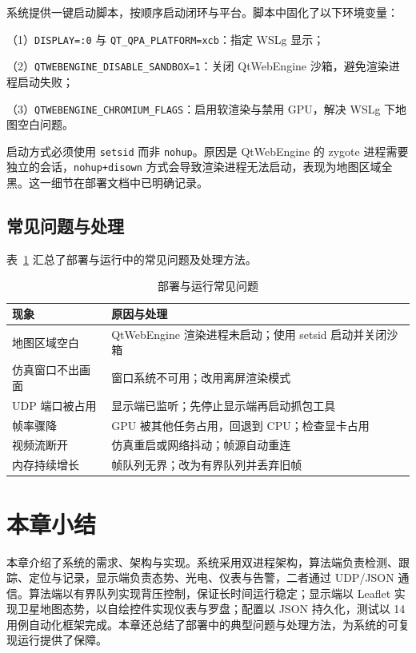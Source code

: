 系统提供一键启动脚本，按顺序启动闭环与平台。脚本中固化了以下环境变量：

（1）\texttt{DISPLAY=:0} 与 \texttt{QT\_QPA\_PLATFORM=xcb}：指定 WSLg 显示；

（2）\texttt{QTWEBENGINE\_DISABLE\_SANDBOX=1}：关闭 QtWebEngine 沙箱，避免渲染进程启动失败；

（3）\texttt{QTWEBENGINE\_CHROMIUM\_FLAGS}：启用软渲染与禁用 GPU，解决 WSLg 下地图空白问题。

启动方式必须使用 \texttt{setsid} 而非 \texttt{nohup}。原因是 QtWebEngine 的 zygote 进程需要独立的会话，\texttt{nohup+disown} 方式会导致渲染进程无法启动，表现为地图区域全黑。这一细节在部署文档中已明确记录。

\subsection{常见问题与处理}

表~\ref{tab:deploy_issues} 汇总了部署与运行中的常见问题及处理方法。

\begin{table}[htbp]
\centering
\caption{部署与运行常见问题}
\label{tab:deploy_issues}
\small
\begin{tabularx}{\textwidth}{lX}
\toprule
\textbf{现象} & \textbf{原因与处理} \\
\midrule
地图区域空白 & QtWebEngine 渲染进程未启动；使用 setsid 启动并关闭沙箱 \\
仿真窗口不出画面 & 窗口系统不可用；改用离屏渲染模式 \\
UDP 端口被占用 & 显示端已监听；先停止显示端再启动抓包工具 \\
帧率骤降 & GPU 被其他任务占用，回退到 CPU；检查显卡占用 \\
视频流断开 & 仿真重启或网络抖动；帧源自动重连 \\
内存持续增长 & 帧队列无界；改为有界队列并丢弃旧帧 \\
\bottomrule
\end{tabularx}
\end{table}

\section{本章小结}

本章介绍了系统的需求、架构与实现。系统采用双进程架构，算法端负责检测、跟踪、定位与记录，显示端负责态势、光电、仪表与告警，二者通过 UDP/JSON 通信。算法端以有界队列实现背压控制，保证长时间运行稳定；显示端以 Leaflet 实现卫星地图态势，以自绘控件实现仪表与罗盘；配置以 JSON 持久化，测试以 14 用例自动化框架完成。本章还总结了部署中的典型问题与处理方法，为系统的可复现运行提供了保障。
